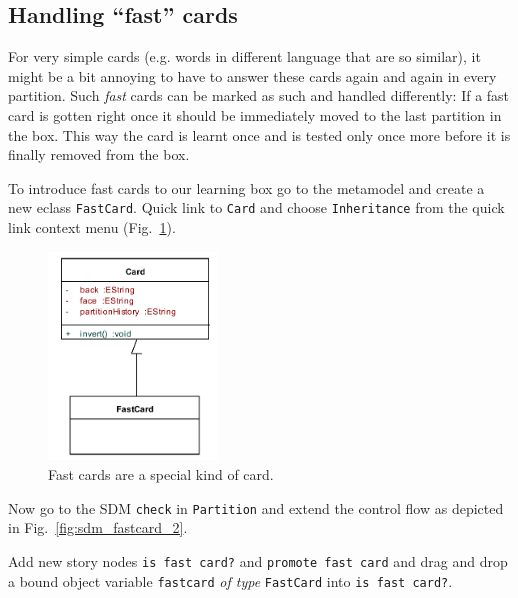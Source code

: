 \subsection{Handling ``fast'' cards}
	
For very simple cards (e.g. words in different language that are so similar), it
might be a bit annoying to have to answer these cards again and again in every
partition.  Such \emph{fast} cards can be marked as such and handled
differently:  If a fast card is gotten right once it should be immediately moved
to the last partition in the box.  This way the card is learnt once and is
tested only once more before it is finally removed from the box.

To introduce fast cards to our learning box go to the metamodel and create a new
eclass \texttt{FastCard}.  Quick link to \texttt{Card} and choose
\texttt{Inheritance} from the quick link context menu
(Fig.~\ref{fig:sdm_fastcard_1}). 

\begin{figure}[htp]
\begin{center}
  \includegraphics[width=0.4\textwidth]{pics/sdmBilder/bindings/fastcard}
  \caption{Fast cards are a special kind of card.}  
  \label{fig:sdm_fastcard_1}
\end{center}
\end{figure}

Now go to the SDM \texttt{check} in \texttt{Partition} and extend the control
flow as depicted in Fig.~\ref{fig:sdm_fastcard_2}. 
 
Add new story nodes
\texttt{is fast card?} and \texttt{promote fast card} and drag and drop a bound
object variable \texttt{fastcard} \emph{of type} \texttt{FastCard} into \texttt{is fast card?}.  

